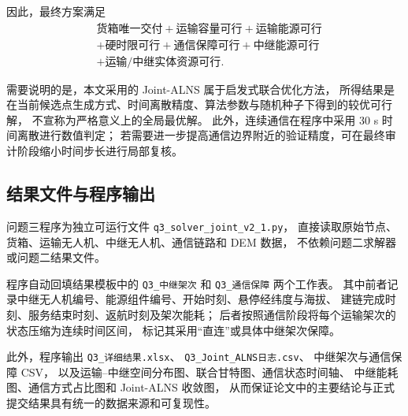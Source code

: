 因此，最终方案满足
\[
\boxed{
\begin{aligned}
&\text{货箱唯一交付}
+\text{运输容量可行}
+\text{运输能源可行}\\
&+\text{硬时限可行}
+\text{通信保障可行}
+\text{中继能源可行}\\
&+\text{运输/中继实体资源可行}.
\end{aligned}}
\]

需要说明的是，本文采用的 Joint-ALNS 属于启发式联合优化方法，
所得结果是在当前候选点生成方式、时间离散精度、算法参数与随机种子下得到的较优可行解，
不宣称为严格意义上的全局最优解。
此外，连续通信在程序中采用 30 s 时间离散进行数值判定；
若需要进一步提高通信边界附近的验证精度，可在最终审计阶段缩小时间步长进行局部复核。

\subsection{结果文件与程序输出}

问题三程序为独立可运行文件
\texttt{q3\_solver\_joint\_v2\_1.py}，
直接读取原始节点、货箱、运输无人机、中继无人机、通信链路和 DEM 数据，
不依赖问题二求解器或问题二结果文件。

程序自动回填结果模板中的
\texttt{Q3\_中继架次} 和 \texttt{Q3\_通信保障} 两个工作表。
其中前者记录中继无人机编号、能源组件编号、开始时刻、悬停经纬度与海拔、
建链完成时刻、服务结束时刻、返航时刻及架次能耗；
后者按照通信阶段将每个运输架次的状态压缩为连续时间区间，
标记其采用“直连”或具体中继架次保障。

此外，程序输出
\texttt{Q3\_详细结果.xlsx}、
\texttt{Q3\_Joint\_ALNS日志.csv}、
中继架次与通信保障 CSV，
以及运输--中继空间分布图、联合甘特图、通信状态时间轴、
中继能耗图、通信方式占比图和 Joint-ALNS 收敛图，
从而保证论文中的主要结论与正式提交结果具有统一的数据来源和可复现性。
